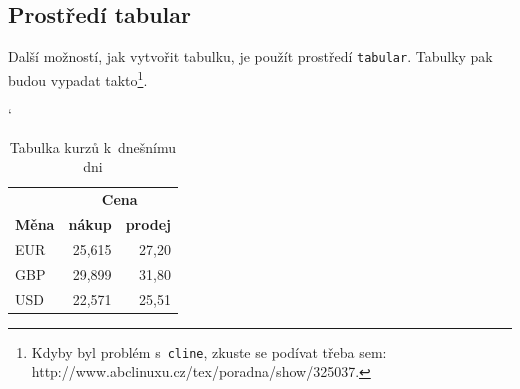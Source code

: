 \documentclass[11pt, a4paper]{article}
\begin{document}
\subsection{Prostředí tabular}
Další možností, jak vytvořit tabulku, je použít prostředí \verb|tabular|. Tabulky pak budou vypadat takto\footnote{Kdyby byl problém s~\texttt{cline}, zkuste se podívat třeba sem: http://www.abclinuxu.cz/tex/poradna/show/325037.}.

\begin{table}[ht]
	\catcode`
	\begin{center}
	\begin{tabular}{| l | r | r |} \hline
						& \multicolumn{2}{|c|}{\textbf{Cena}} \\ \cline{2-3} 
		\textbf{Měna} 	& \textbf{nákup} 	& \textbf{prodej} \\ \hline
		EUR 			& 25,615			& 27,20 \\
		GBP 			& 29,899			& 31,80 \\
		USD 			& 22,571 			& 25,51 \\ \hline
	\end{tabular}
	\caption{Tabulka kurzů k~dnešnímu dni} \label{tbl1}
	\end{center}
\end{table}
\end{document}

